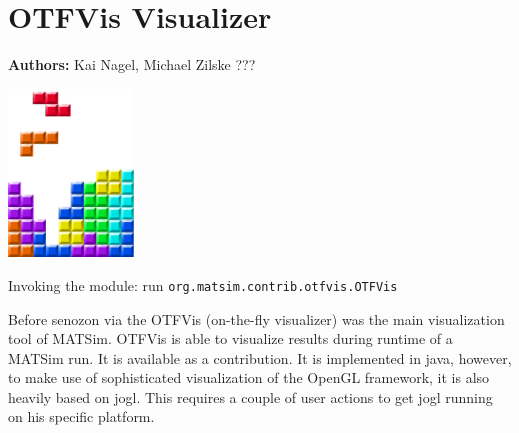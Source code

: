 \chapter{OTFVis Visualizer}
\label{ch:otfvis}

\hfill \textbf{Authors:} Kai Nagel, Michael Zilske ???

\begin{center} \includegraphics[width=0.25\textwidth, angle=0]{figures/MATSimBook.png} \end{center}


\begin{compactitem}
\item Invoking the module: run \lstinline|org.matsim.contrib.otfvis.OTFVis|
\end{compactitem}

Before senozon via the OTFVis (on-the-fly visualizer) \citep[][]{Strippgen_PhDThesis_2009} was the main visualization tool of MATSim. OTFVis is able to visualize results during runtime of a MATSim run. It is available as a contribution. It is implemented in java, however, to make use of sophisticated visualization of the OpenGL framework, it is also heavily based on jogl. This requires a couple of user actions to get jogl running on his specific platform. 







